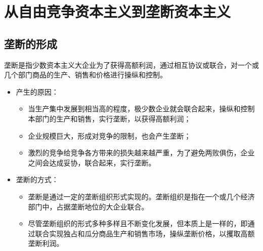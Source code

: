 \documentclass[12pt,openany]{ctexbook}
\begin{document}
\section{从自由竞争资本主义到垄断资本主义}
\subsection{垄断的形成}
\begin{mdquote}
垄断是指少数资本主义大企业为了获得高额利润，通过相互协议或联合，对一个或几个部门商品的生产、销售和价格进行操纵和控制。
\end{mdquote}
\begin{itemize}
  \item 产生的原因：
\begin{itemize}
  \item 当生产集中发展到相当高的程度，极少数企业就会联合起来，操纵和控制本部门的生产和销售，实行垄断，以获得高额利润；
  \item 企业规模巨大，形成对竞争的限制，也会产生垄断；
  \item 激烈的竞争给竞争各方带来的损失越来越严重，为了避免两败俱伤，企业之间会达成妥协，联合起来，实行垄断。
\end{itemize}
  \item 垄断的方式：
\begin{itemize}
  \item 垄断是通过一定的垄断组织形式实现的。垄断组织是指在一个或几个经济部门中，占据垄断地位的大企业联合。
  \item 尽管垄断组织的形式多种多样且不断变化发展，但本质上是一样的，即通过联合实现独占和瓜分商品生产和销售市场，操纵垄断价格，以攫取高额垄断利润。
\end{itemize}
\end{itemize}
\end{document}
